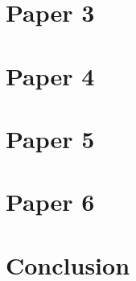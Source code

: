 \section{Paper 3}



\section{Paper 4}



\section{Paper 5}



\section{Paper 6}



\section{Conclusion}








